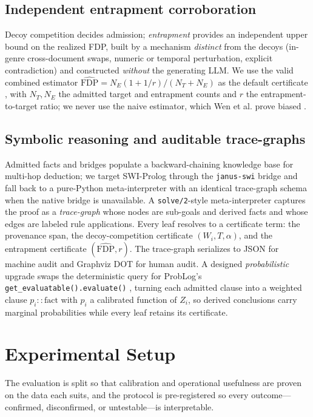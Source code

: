 \documentclass[11pt,letterpaper]{article}
\begin{document}
\subsection{Independent entrapment corroboration}

Decoy competition decides admission; \emph{entrapment} provides an independent upper bound on the realized FDP, built by a mechanism \emph{distinct} from the decoys (in-genre cross-document swaps, numeric or temporal perturbation, explicit contradiction) and constructed \emph{without} the generating LLM. We use the valid combined estimator $\widehat{\mathrm{FDP}} = N_E(1 + 1/r)/(N_T + N_E)$ as the default certificate \cite{Wen2024}, with $N_T,N_E$ the admitted target and entrapment counts and $r$ the entrapment-to-target ratio; we never use the naive estimator, which Wen et al. prove biased \cite{Wen2024}.

\subsection{Symbolic reasoning and auditable trace-graphs}

Admitted facts and bridges populate a backward-chaining knowledge base for multi-hop deduction; we target SWI-Prolog through the \texttt{janus-swi} bridge and fall back to a pure-Python meta-interpreter with an identical trace-graph schema when the native bridge is unavailable. A \texttt{solve/2}-style meta-interpreter captures the proof as a \emph{trace-graph} whose nodes are sub-goals and derived facts and whose edges are labeled rule applications. Every leaf resolves to a certificate term: the provenance span, the decoy-competition certificate $(W_i, T, \alpha)$, and the entrapment certificate $(\widehat{\mathrm{FDP}}, r)$. The trace-graph serializes to JSON for machine audit and Graphviz DOT for human audit. A designed \emph{probabilistic} upgrade swaps the deterministic query for ProbLog's \texttt{get\_evaluatable().evaluate()} \cite{Raedt2007}, turning each admitted clause into a weighted clause $p_i :: \mathrm{fact}$ with $p_i$ a calibrated function of $Z_i$, so derived conclusions carry marginal probabilities while every leaf retains its certificate.

\section{Experimental Setup}

The evaluation is split so that calibration and operational usefulness are proven on the data each suits, and the protocol is pre-registered so every outcome---confirmed, disconfirmed, or untestable---is interpretable.
\end{document}
